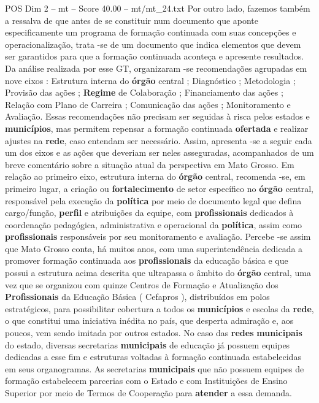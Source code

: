 \begin{textsample}{POS Dim 2 – mt – Score 40.00 – mt/mt\_24.txt}
Por outro lado, fazemos também a ressalva de que antes de se constituir num documento que aponte especificamente um programa de formação continuada com suas concepções e operacionalização, trata -se de um documento que indica elementos que devem ser garantidos para que a formação continuada aconteça e apresente resultados.
Da análise realizada por esse GT, organizaram -se recomendações agrupadas em nove eixos : Estrutura interna do \textbf{órgão} central ; Diagnóstico ; Metodologia ; Provisão das ações ; \textbf{Regime} de Colaboração ; Financiamento das ações ; Relação com Plano de Carreira ; Comunicação das ações ; Monitoramento e Avaliação.
Essas recomendações não precisam ser seguidas à risca pelos estados e \textbf{municípios}, mas permitem repensar a formação continuada \textbf{ofertada} e realizar ajustes na \textbf{rede}, caso entendam ser necessário.
Assim, apresenta -se a seguir cada um dos eixos e as ações que deveriam ser neles asseguradas, acompanhados de um breve comentário sobre a situação atual da perspectiva em Mato Grosso.
Em relação ao primeiro eixo, estrutura interna do \textbf{órgão} central, recomenda -se, em primeiro lugar, a criação ou \textbf{fortalecimento} de setor específico no \textbf{órgão} central, responsável pela execução da \textbf{política} por meio de documento legal que defina cargo/função, \textbf{perfil} e atribuições da equipe, com \textbf{profissionais} dedicados à coordenação pedagógica, administrativa e operacional da \textbf{política}, assim como \textbf{profissionais} responsáveis por seu monitoramento e avaliação.
Percebe -se assim que Mato Grosso conta, há muitos anos, com uma superintendência dedicada a promover formação continuada aos \textbf{profissionais} da educação básica e que possui a estrutura acima descrita que ultrapassa o âmbito do \textbf{órgão} central, uma vez que se organizou com quinze Centros de Formação e Atualização dos \textbf{Profissionais} da Educação Básica ( Cefapros ), distribuídos em polos estratégicos, para possibilitar cobertura a todos os \textbf{municípios} e escolas da \textbf{rede}, o que constitui uma iniciativa inédita no país, que desperta admiração e, aos poucos, vem sendo imitada por outros estados.
No caso das \textbf{redes} \textbf{municipais} do estado, diversas secretarias \textbf{municipais} de educação já possuem equipes dedicadas a esse fim e estruturas voltadas à formação continuada estabelecidas em seus organogramas.
As secretarias \textbf{municipais} que não possuem equipes de formação estabelecem parcerias com o Estado e com Instituições de Ensino Superior por meio de Termos de Cooperação para \textbf{atender} a essa demanda.

\end{textsample}
